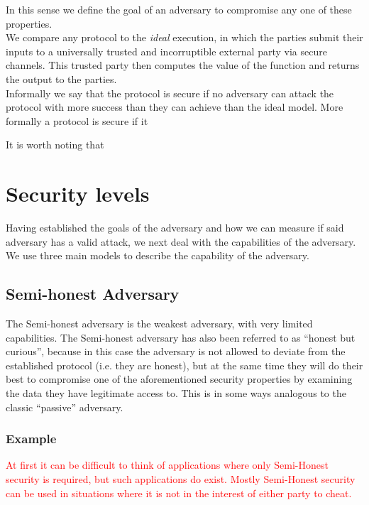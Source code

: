 \documentclass[ %
                    author={Nicholas Tutte},
                supervisor={Prof. Nigel Smart},
                    degree={MEng},
                     title={Secure Two Party Computation},
                  subtitle={A practical comparison of recent protocols},
                      type={Research - GG1K},
                      year={2015} ]{dissertation}
\begin{document}
			In this sense we define the goal of an adversary to compromise any one of these properties.\\

			We compare any protocol to the \emph{ideal} execution, in which the parties submit their inputs to a universally trusted and incorruptible external party via secure channels. This trusted party then computes the value of the function and returns the output to the parties.\\

			Informally we say that the protocol is secure if no adversary can attack the protocol with more success than they can achieve than the ideal model. More formally a protocol is secure if it 

			It is worth noting that 


		\section{Security levels}\label{sub:SecurityLevels}
			Having established the goals of the adversary and how we can measure if said adversary has a valid attack, we next deal with the capabilities of the adversary. We use three main models to describe the capability of the adversary.

			\subsection{Semi-honest Adversary}
				The Semi-honest adversary is the weakest adversary, with very limited capabilities. The Semi-honest adversary has also been referred to as ``honest but curious'', because in this case the adversary is not allowed to deviate from the established protocol (i.e. they are honest), but at the same time they will do their best to compromise one of the aforementioned security properties by examining the data they have legitimate access to. This is in some ways analogous to the classic ``passive'' adversary.

				\subsubsection{Example}

				\textcolor{red}{At first it can be difficult to think of applications where only Semi-Honest security is required, but such applications do exist. Mostly Semi-Honest security can be used in situations where it is not in the interest of either party to cheat.}\\
\end{document}
